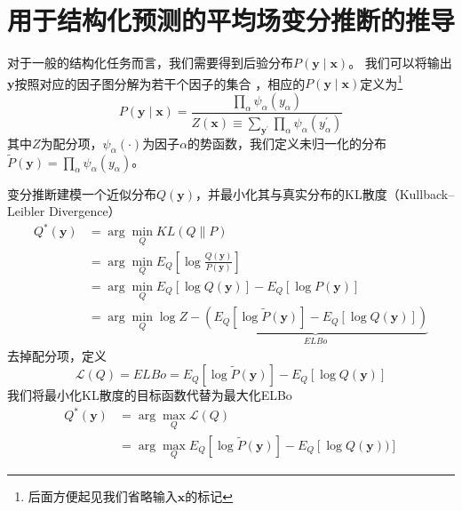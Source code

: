 \chapter{用于结构化预测的平均场变分推断的推导}
\label{appendix:mfvi-derivation}
对于一般的结构化任务而言，我们需要得到后验分布$P(\boldsymbol{y}\mid\boldsymbol{x})$。
我们可以将输出$\boldsymbol{y}$按照对应的因子图分解为若干个因子的集合 \citep{sutton-etal-2012-crf}，相应的$P(\boldsymbol{y}\mid\boldsymbol{x})$定义为\footnote{后面方便起见我们省略输入$\boldsymbol{x}$的标记}
\begin{equation}\label{eq:posterior}
	P(\boldsymbol{y}\mid\boldsymbol{x}) =\frac{\prod_{\alpha} \psi_{\alpha}(y_{\alpha})}{Z(\boldsymbol{x})\equiv\sum_{\boldsymbol{y}^{\prime}}\prod_{\alpha} \psi_{\alpha}(y^{\prime}_{\alpha})}
\end{equation}
其中$Z$为配分项，$\psi_{\alpha}(\cdot)$为因子$\alpha$的势函数，我们定义未归一化的分布$\tilde{P}(\boldsymbol{y})=\prod_{\alpha} \psi_{\alpha}(y_{\alpha})$。

变分推断建模一个近似分布$Q(\boldsymbol{y})$，并最小化其与真实分布的KL散度（Kullback–Leibler Divergence）
\begin{equation}
	\begin{split}
		Q^{\ast}(\boldsymbol{y})
		&=\arg\min_{Q} KL(Q\|P)\\
		&=\arg\min_{Q} E_{Q}\left[\log\frac{Q(\boldsymbol{y})}{P(\boldsymbol{y})}\right]\\
		&=\arg\min_{Q} E_{Q}\left[\log Q(\boldsymbol{y})\right] - E_{Q}\left[\log P(\boldsymbol{y})\right]\\
		&=\arg\min_{Q} \log Z-\underbrace{\left(E_{Q}\left[\log \tilde{P}(\boldsymbol{y})\right]-E_{Q}\left[\log Q(\boldsymbol{y})\right]\right)}_{ELBo}
	\end{split}
\end{equation}
去掉配分项，定义
\begin{equation}
	\mathcal{L}(Q)=ELBo=E_{Q}\left[\log \tilde{P}(\boldsymbol{y})\right]-E_{Q}\left[\log Q(\boldsymbol{y})\right]
\end{equation}
我们将最小化KL散度的目标函数代替为最大化ELBo
\begin{equation}
	\begin{split}
		Q^{\ast}(\boldsymbol{y}) &= \arg\max_{Q}\mathcal{L}(Q)\\
		&= \arg\max_{Q}E_{Q}\left[\log \tilde{P}(\boldsymbol{y})\right]-E_{Q}\left[\log Q(\boldsymbol{y}))\right]
	\end{split}
\end{equation}


